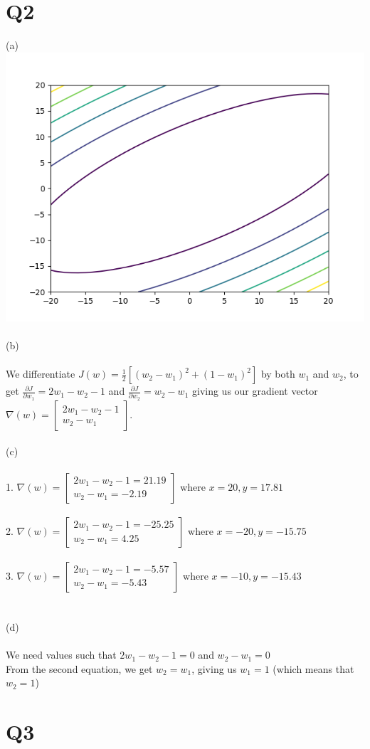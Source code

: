 \documentclass{article}
\begin{document}
\section{Q2}
(a)
\includegraphics[scale=0.75]{contour map.png}\\ \\
(b)\\
\\
We differentiate $J(w) = \frac{1}{2}[(w_2 - w_1 )^2 + (1- w_1)^2]$ by both $w_1$ and $w_2$, to get $\frac{\partial J}{\partial w_1} = 2w_1 - w_2 -1$ and $\frac{\partial J}{\partial w_2} = w_2 - w_1$ giving us our gradient vector $\nabla(w)= \begin{bmatrix}2w_1 - w_2 -1 \\ w_2 - w_1 \end{bmatrix}$.\\
\\
(c)\\ \\
1. $\nabla(w)= \begin{bmatrix}2w_1 - w_2 -1= 21.19 \\ w_2 - w_1=-2.19 \end{bmatrix}$ where $x=20,y=17.81$\\ \\
2. $\nabla(w)= \begin{bmatrix}2w_1 - w_2 -1= -25.25 \\ w_2 - w_1=4.25 \end{bmatrix}$ where $x= -20, y= -15.75$\\ \\
3. $\nabla(w)= \begin{bmatrix}2w_1 - w_2 -1= -5.57  \\ w_2 - w_1=-5.43 \end{bmatrix}$ where $x=-10,y=-15.43$\\ \\
\\
(d)\\ \\
We need values such that $2w_1 - w_2 -1 = 0$ and $w_2 - w_1 = 0$\\
From the second equation, we get $w_2=w_1$, giving us $w_1=1$ (which means that $w_2 = 1$)

\section{Q3}
\end{document}
